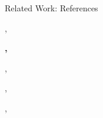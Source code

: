\documentclass[aspectratio=169,fleqn]{beamer}
\begin{document}
  \begin{frame}{Related Work: References}
    \small
    \onslide<+->
    \begin{description}
      \item<+->[\citeyear{lee1980}] \citeauthor{lee1980}, 
      \item<+->[\citeyear{guibas1985}] \textbf<7>{\citeauthor{guibas1985}, }
      \item<+->[\citeyear{dwyer1987}] \citeauthor{dwyer1987}, 
      \item<+->[\citeyear{shewchuk1996}] \citeauthor{shewchuk1996}, 
      \item<+->[\citeyear{fuetterling2014}] \citeauthor{fuetterling2014}, 
    \end{description}
  \end{frame}
\end{document}
